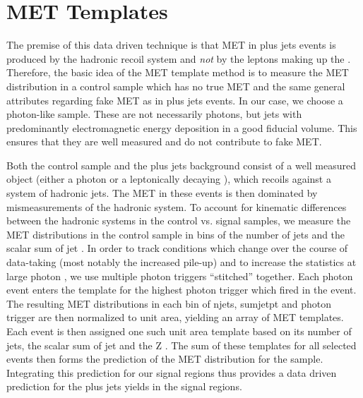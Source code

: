 
\section{MET Templates}
\label{sec:templates}

The premise of this data driven technique is that MET in \Z plus jets events
is produced by the hadronic recoil system and {\it not} by the leptons making up the \Z.
Therefore, the basic idea of the MET template method is to measure the MET distribution in 
a control sample which has no true MET and the same general attributes regarding
fake MET as in \Z plus jets events.
In our case, we choose a photon-like sample. These are not necessarily photons, but jets with predominantly 
electromagnetic energy deposition in a good fiducial volume. This ensures that 
they are well measured and do not contribute to fake MET.

Both the control sample and the \Z plus jets background
consist of a well measured object (either a photon or a leptonically decaying \Z), which recoils 
against a system of hadronic jets. The MET in these events 
is then dominated by mismeasurements of the hadronic system. To account for kinematic 
differences between the hadronic systems in the control vs. signal samples, 
we measure the MET distributions in the control sample in bins of the number of jets and the 
scalar sum of jet \pt. In order to track conditions which change over the course of data-taking
(most notably the increased pile-up) and to increase the statistics at large photon \pt, we
use multiple photon triggers ``stitched'' together. Each photon event enters the template for the
highest \pt photon trigger which fired in the event. The resulting MET 
distributions in each bin of njets, sumjetpt and photon trigger are then normalized to unit area, yielding an array of MET templates. 
Each \Z event is then assigned one such 
unit area template based on its number of jets, the scalar sum of jet \pt and the Z \pt.
The sum of these templates for all selected \Z events then forms the 
prediction of the MET distribution for the \Z sample. Integrating this prediction for our 
signal regions  thus provides a data driven prediction for the \Z plus jets yields in the signal regions. 


